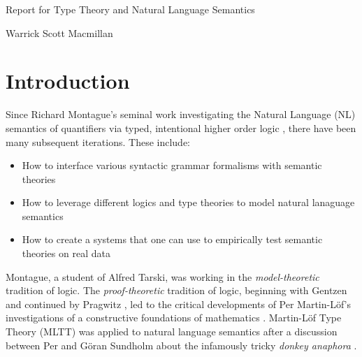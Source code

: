\documentclass[a4paper, 11pt]{article}
\begin{document}

\begin{titlepage}

\vspace*{1cm}

\begin{center} \Large Report for Type Theory and Natural Language Semantics\\ 

\vspace{1.5cm}

\large Warrick Scott Macmillan \end{center}

\end{titlepage}

\section{Introduction} 

Since Richard Montague's seminal work investigating the Natural Language (NL)
semantics of quantifiers via typed, intentional higher order logic 
\cite{Montague1973}, there have been many subsequent iterations. These include:

\begin{itemize}
\item How to interface various syntactic grammar formalisms with semantic theories 
\item How to leverage different logics and type theories to model natural
  lanaguage semantics
\item How to create a systems that one can use to empirically test 
  semantic theories on real data
\end{itemize}

Montague, a student of Alfred Tarski, was working in the \emph{model-theoretic}
tradition of logic. The \emph{proof-theoretic} tradition of logic, beginning
with Gentzen \cite{Gentzen1935} and continued by Pragwitz
\cite{prawitz2006natural}, led to the critical developments of Per Martin-Löf's
investigations of a constructive foundations of mathematics \cite{ml79}
\cite{ml1984}. Martin-Löf Type Theory (MLTT) was applied to natural language
semantics after a discussion between Per and Göran Sundholm about the infamously
tricky \emph{donkey anaphora} \cite{Sundholm1986}.
\end{document}
